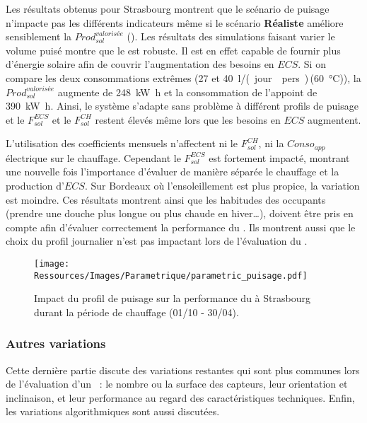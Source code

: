 Les résultats obtenus pour Strasbourg montrent que le scénario de puisage n’impacte pas
les différents indicateurs même si le scénario \textbf{Réaliste} améliore sensiblement la
$Prod_{sol}^{valorisée}$ (). Les résultats des
simulations faisant varier le volume puisé montre que le  est robuste. Il est en
effet capable de fournir plus d’énergie solaire afin de couvrir l’augmentation des besoins
en $ECS$. Si on compare les deux consommations extrêmes (\num{27} et
\SI{40}{\litre/(jour\period pers)}\,(\SI{60}{\celsius})), la $Prod_{sol}^{valorisée}$
augmente de \SI{248}{\kilo\watt\hour} et la consommation de l’appoint de \SI{390}{\kilo\watt\hour}.
Ainsi, le système s’adapte sans problème à différent profils de puisage et le
$F_{sol}^{ECS}$ et le $F_{sol}^{CH}$ restent élevés même lors que les besoins en $ECS$ augmentent.

L’utilisation des coefficients mensuels n’affectent ni le $F_{sol}^{CH}$, ni la $Conso_{app}$
électrique sur le chauffage. Cependant le $F_{sol}^{ECS}$ est fortement impacté, montrant une
nouvelle fois l’importance d’évaluer de manière séparée le chauffage et la production
d’$ECS$. Sur Bordeaux où l’ensoleillement est plus propice, la variation est moindre. Ces
résultats montrent ainsi que les habitudes des occupants (prendre une douche plus longue
ou plus chaude en hiver\dots), doivent être pris en compte afin d’évaluer correctement la
performance du . Ils montrent aussi que le choix du profil journalier n’est pas impactant lors
de l’évaluation du .

\begin{figure}
    \centering
    \texttt{[image: Ressources/Images/Parametrique/parametric\_puisage.pdf]}
    \caption{Impact du profil de puisage sur la performance
             du  à Strasbourg durant la période de chauffage (01/10 - 30/04).}
    \label{fig:impact_profil_puisage}
\end{figure}


\subsubsection{Autres variations} %
\label{ssub:autres_variations}
Cette dernière partie discute des variations restantes qui sont plus communes lors
de l’évaluation d’un ~: le nombre ou la surface des capteurs, leur
orientation et inclinaison, et leur performance au regard des caractéristiques techniques.
Enfin, les variations algorithmiques sont aussi discutées.

